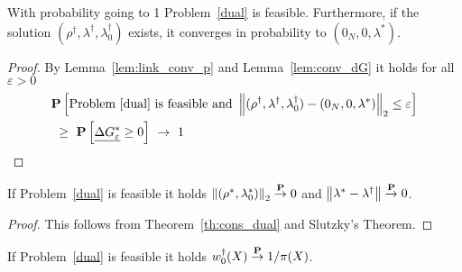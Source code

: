 \begin{theorem}
  \label{th:cons_dual}
  With probability going to 1 Problem~\ref{dual} is feasible.
  Furthermore, if the solution 
$
(\rho^\dagger,\lambda^\dagger,\lambda_0^\dagger)
$
exists,
it
converges in probability to 
$
(0_N,0,\lambda^*)
$.
\end{theorem}
\begin{proof}
  By Lemma~\ref{lem:link_conv_p} and Lemma~\ref{lem:conv_dG}
  it holds for all $\varepsilon>0$
  \begin{align*}
    &
    \P
    \left[ 
      \text{Problem~\ref{dual} is feasible and }
      \norm{
(\rho^\dagger,\lambda^\dagger,\lambda_0^\dagger)
-
(0_N,0,\lambda^*)
      }_2
      \le \varepsilon
    \right]
    \\
    &
    \ 
    \ge
    \ 
    \P
    \left[ \underline{\Delta G^*_\varepsilon}\ge 0 \right]
    \ 
    \to
    \ 
    1
  \end{align*}
\end{proof}
\begin{corollary}
  If Problem~\ref{dual} is feasible it holds
  $\norm{(\rho^*,\lambda_0^*)}_2\overset{\P}{\to}0$
  and
  $\norm{\lambda^*-\lambda^\dagger}\overset{\P}{\to}0$.
\end{corollary}
\begin{proof}
  This follows from Theorem~\ref{th:cons_dual}
  and Slutzky's Theorem.
\end{proof}
\begin{theorem}
  If Problem~\ref{dual} is feasible it holds
  $w_0^\dagger(X)\overset{\P}{\to}1/\pi(X)$.
\end{theorem}

